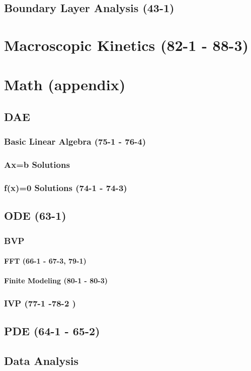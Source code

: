 \documentclass{report}
\begin{document}
\section{Boundary Layer Analysis (43-1)}
\chapter{Macroscopic Kinetics (82-1 - 88-3)}
\chapter{Math (appendix)}
\section{DAE}
\subsection{Basic Linear Algebra (75-1 - 76-4)}
\subsection{Ax=b Solutions}
\subsection{f(x)=0 Solutions (74-1 - 74-3)}
\section{ODE (63-1)}
\subsection{BVP}
\subsubsection{FFT (66-1 - 67-3, 79-1)}
\subsubsection{Finite Modeling (80-1 - 80-3)}
\subsection{IVP (77-1 -78-2 )}
\section{PDE (64-1 - 65-2)}
\section{Data Analysis}
\end{document}
